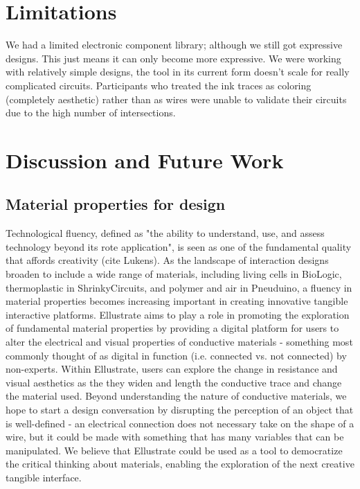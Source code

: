 \documentclass{sigchi}
\begin{document}

\section{Limitations}
  We had a limited electronic component library; although we still got expressive designs. This just means it can only become more expressive. We were working with relatively simple designs, the tool in its current form doesn't scale for really complicated circuits. Participants who treated the ink traces as coloring (completely aesthetic) rather than as wires were unable to validate their circuits due to the high number of intersections.


\section {Discussion and Future Work}

\subsection{Material properties for design}

Technological fluency, defined as "the ability to understand, use, and assess technology beyond its rote application", is seen as one of the fundamental quality that affords creativity (cite Lukens). As the landscape of interaction designs broaden to include a wide range of materials, including living cells in BioLogic, thermoplastic in ShrinkyCircuits, and polymer and air in Pneuduino, a fluency in material properties becomes increasing important in creating innovative tangible interactive platforms. Ellustrate aims to play a role in promoting the exploration of fundamental material properties by providing a digital platform for users to alter the electrical and visual properties of conductive materials - something most commonly thought of as digital in function (i.e. connected vs. not connected) by non-experts. Within Ellustrate, users can explore the change in resistance and visual aesthetics as the they widen and length the conductive trace and change the material used. Beyond understanding the nature of conductive materials, we hope to start a design conversation by disrupting the perception of an object that is well-defined - an electrical connection does not necessary take on the shape of a wire, but it could be made with something that has many variables that can be manipulated. We believe that Ellustrate could be used as a tool to democratize the critical thinking about materials, enabling the exploration of the next creative tangible interface. 
\end{document}
